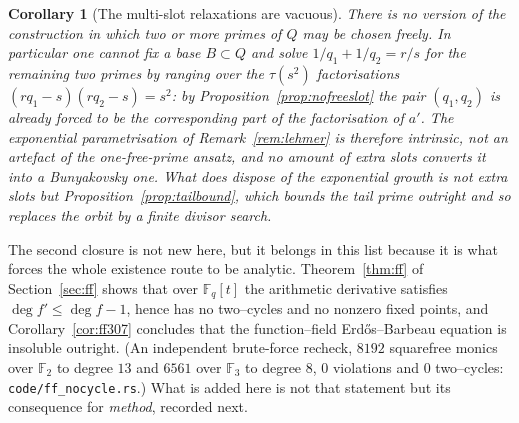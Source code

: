 \documentclass[11pt]{article}
\newtheorem{corollary}[theorem]{Corollary}
\theoremstyle{definition}
\begin{document}
\begin{corollary}[The multi-slot relaxations are vacuous]\label{cor:noslack}
There is no version of the construction in which two or more primes of $Q$ may be chosen freely.
In particular one cannot fix a base $B\subset Q$ and solve $1/q_1+1/q_2=r/s$ for the remaining two
primes by ranging over the $\tau(s^2)$ factorisations $(rq_1-s)(rq_2-s)=s^2$: by
Proposition~\ref{prop:nofreeslot} the pair $(q_1,q_2)$ is already forced to be the corresponding
part of the factorisation of $a'$. The exponential parametrisation of
Remark~\textup{\ref{rem:lehmer}} is therefore intrinsic, not an artefact of the one-free-prime
ansatz, and no amount of extra slots converts it into a Bunyakovsky one. What does dispose of the
exponential growth is not extra slots but Proposition~\ref{prop:tailbound}, which bounds the tail
prime outright and so replaces the orbit by a finite divisor search.
\end{corollary}

The second closure is not new here, but it belongs in this list because it is what forces the whole
existence route to be analytic. Theorem~\ref{thm:ff} of Section~\ref{sec:ff} shows that over
$\mathbb{F}_q[t]$ the arithmetic derivative satisfies $\deg f'\le\deg f-1$, hence has no two--cycles
and no nonzero fixed points, and Corollary~\ref{cor:ff307} concludes that the function--field
Erd\H{o}s--Barbeau equation is insoluble outright. \textup{(An independent brute-force recheck,
$8192$ squarefree monics over $\mathbb{F}_2$ to degree $13$ and $6561$ over $\mathbb{F}_3$ to
degree $8$, $0$ violations and $0$ two--cycles: \texttt{code/ff\_nocycle.rs}.)} What is added here
is not that statement but its consequence for \emph{method}, recorded next.
\end{document}

